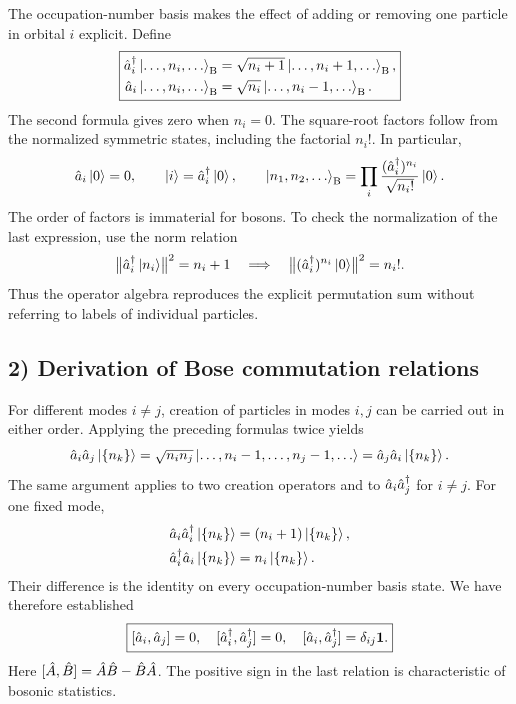 The occupation-number basis makes the effect of adding or removing one particle in orbital $i$ explicit. Define
\begin{equation}
\boxed{\begin{aligned}
\hat{a}_i^\dagger\left|\ldots,n_i,\ldots\right\rangle_{\mathrm B}
  &=\sqrt{n_i+1}\left|\ldots,n_i+1,\ldots\right\rangle_{\mathrm B},\\
\hat{a}_i\left|\ldots,n_i,\ldots\right\rangle_{\mathrm B}
  &=\sqrt{n_i}\left|\ldots,n_i-1,\ldots\right\rangle_{\mathrm B}.
\end{aligned}}
\end{equation}
The second formula gives zero when $n_i=0$. The square-root factors follow from the normalized symmetric states, including the factorial $n_i!$. In particular,
\begin{equation}
\hat{a}_i\left|0\right\rangle=0,\qquad\left|i\right\rangle=\hat{a}_i^\dagger\left|0\right\rangle,\qquad
\left|n_1,n_2,\ldots\right\rangle_{\mathrm B}
=\prod_i\frac{(\hat{a}_i^\dagger)^{n_i}}{\sqrt{n_i!}}\left|0\right\rangle.
\end{equation}
The order of factors is immaterial for bosons. To check the normalization of the last expression, use the norm relation
\begin{equation}
\bigl\|\hat{a}_i^\dagger\left|n_i\right\rangle\bigr\|^2=n_i+1
\quad\Longrightarrow\quad
\bigl\|(\hat{a}_i^\dagger)^{n_i}\left|0\right\rangle\bigr\|^2=n_i!.
\end{equation}
Thus the operator algebra reproduces the explicit permutation sum without referring to labels of individual particles.

\subsection*{2) Derivation of Bose commutation relations}

For different modes $i\ne j$, creation of particles in modes $i,j$ can be carried out in either order. Applying the preceding formulas twice yields
\begin{equation}
\hat{a}_i\hat{a}_j\left|\{n_k\}\right\rangle
  =\sqrt{n_i n_j}\left|\ldots,n_i-1,\ldots,n_j-1,\ldots\right\rangle
  =\hat{a}_j\hat{a}_i\left|\{n_k\}\right\rangle.
\end{equation}
The same argument applies to two creation operators and to $\hat{a}_i\hat{a}_j^\dagger$ for $i\ne j$. For one fixed mode,
\begin{equation}
\begin{aligned}
\hat{a}_i\hat{a}_i^\dagger\left|\{n_k\}\right\rangle
 &=(n_i+1)\left|\{n_k\}\right\rangle,\\
\hat{a}_i^\dagger\hat{a}_i\left|\{n_k\}\right\rangle
 &=n_i\left|\{n_k\}\right\rangle.
\end{aligned}
\end{equation}
Their difference is the identity on every occupation-number basis state. We have therefore established
\begin{equation}
\boxed{[\hat{a}_i,\hat{a}_j]=0,\quad
[\hat{a}_i^\dagger,\hat{a}_j^\dagger]=0,\quad
[\hat{a}_i,\hat{a}_j^\dagger]=\delta_{ij}\mathbf1.}
\end{equation}
Here $[\hat{A},\hat{B}]=\hat{A}\hat{B}-\hat{B}\hat{A}$. The positive sign in the last relation is characteristic of bosonic statistics.

